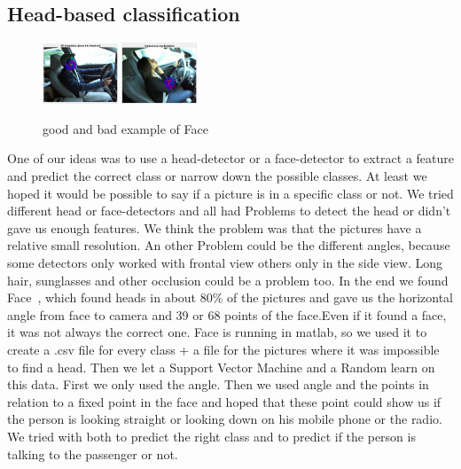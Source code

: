 \documentclass[10pt,twocolumn,letterpaper]{article}
\begin{document}
\subsection{Head-based classification}
\begin{figure}[h]
	\centering
	\includegraphics[width=0.2\textwidth]{face1}\hspace{0.01\textwidth}
	\includegraphics[width=0.2\textwidth]{faces/face7}\\ \vspace{0.01\textwidth}
	\caption{good and bad example of Face}
	\label{face_estimation_example}
\end{figure}
One of our ideas was to use a head-detector or a face-detector to extract a feature and predict the correct class or narrow down the possible classes. At least we hoped it would be possible to say if a picture is in a specific class or not. We tried different head or face-detectors and all had Problems to detect the head or didn't gave us enough features. We think the problem was that the pictures have a relative small resolution. An other Problem could be the different angles, because some detectors only worked with frontal view others only in the side view. Long hair, sunglasses and other occlusion could be a problem too. In the end we found Face~\cite{Ramanan:2012:FDP:2354409.2355119}, which found heads in about 80\% of the pictures and gave us the horizontal angle from face to camera and 39 or 68 points of the face.Even if it found a face, it was not always the correct one. Face is running in matlab, so we used it to create a .csv file for every class + a file for the pictures where it was impossible to find a head. Then we let a Support Vector Machine and a Random learn on this data. First we only used the angle. Then we used angle and the points in relation to a fixed point in the face and hoped that these point could show us if the person is looking straight or looking down on his mobile phone or the radio. We tried with both to predict the right class and to predict if the person is talking to the passenger or not.
\end{document}
